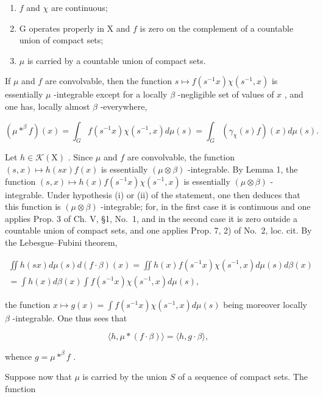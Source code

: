 \begin{enumerate}
\def\labelenumi{(\roman{enumi})}
\item
  \(f\) and \(\chi\) are continuous;
\item
  G operates properly in X and \(f\) is zero on the complement of a countable union of compact sets;
\item
  \(\mu\) is carried by a countable union of compact sets.
\end{enumerate}

If \(\mu\) and \(f\) are convolvable, then the function \(s \mapsto f(s^{-1}x)\chi(s^{-1}, x)\) is essentially \(\mu\) -integrable except for a locally \(\beta\) -negligible set of values of \(x\) , and one has, locally almost \(\beta\) -everywhere,

\[
(\mu * ^ {\beta} f) (x) = \int_ {G} f (s ^ {- 1} x) \chi (s ^ {- 1}, x) d \mu (s) = \int_ {G} (\gamma_ {\chi} (s) f) (x) d \mu (s).\tag{3}
\]

Let \(h \in \mathcal{K}(\mathrm{X})\) . Since \(\mu\) and \(f\) are convolvable, the function \((s, x) \mapsto h(sx)f(x)\) is essentially \((\mu \otimes \beta)\) -integrable. By Lemma 1, the function \((s, x) \mapsto h(x)f(s^{-1}x)\chi(s^{-1}, x)\) is essentially \((\mu \otimes \beta)\) -integrable. Under hypothesis (i) or (ii) of the statement, one then deduces that this function is \((\mu \otimes \beta)\) -integrable; for, in the first case it is continuous and one applies Prop. 3 of Ch. V, §1, No.~1, and in the second case it is zero outside a countable union of compact sets, and one applies Prop. 7, 2) of No.~2, loc. cit. By the Lebesgue--Fubini theorem,

\[
\begin{array}{c} \iint h (s x) d \mu (s) d (f \cdot \beta) (x) = \iint h (x) f (s ^ {- 1} x) \chi (s ^ {- 1}, x) d \mu (s) d \beta (x) \\ = \int h (x) d \beta (x) \int f (s ^ {- 1} x) \chi (s ^ {- 1}, x) d \mu (s), \end{array}
\]

the function \(x \mapsto g(x) = \int f(s^{-1}x)\chi (s^{-1},x)d\mu (s)\) being moreover locally \(\beta\) -integrable. One thus sees that

\[
\langle h, \mu * (f \cdot \beta) \rangle = \langle h, g \cdot \beta \rangle ,
\]

whence \(g = \mu *^{\beta} f\) .

Suppose now that \(\mu\) is carried by the union \(S\) of a sequence of compact sets. The function

